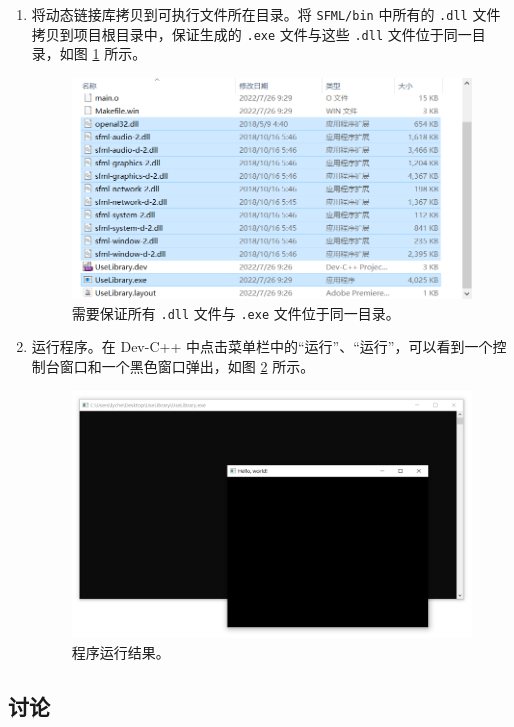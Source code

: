 \begin{enumerate}
\begin{enumerate}
		\item 将动态链接库拷贝到可执行文件所在目录。将 \lstinline[language={}]{SFML/bin} 中所有的 \lstinline[language={}]{.dll} 文件拷贝到项目根目录中，保证生成的 \lstinline[language={}]{.exe} 文件与这些 \lstinline[language={}]{.dll} 文件位于同一目录，如图 \ref{fig:manual-library-6} 所示。

		\begin{figure}
			\centering
			\includegraphics[width=0.75\linewidth]{assets/manual-library-6}
			\caption{需要保证所有 \lstinline[language={}]{.dll} 文件与 \lstinline[language={}]{.exe} 文件位于同一目录。}
			\label{fig:manual-library-6}
		\end{figure}

		\item 运行程序。在 Dev-C++ 中点击菜单栏中的“运行”、“运行”，可以看到一个控制台窗口和一个黑色窗口弹出，如图 \ref{fig:manual-library-7} 所示。

		\begin{figure}
			\centering
			\includegraphics[width=0.75\linewidth]{assets/manual-library-7}
			\caption{程序运行结果。}
			\label{fig:manual-library-7}
		\end{figure}
	\end{enumerate}
\end{enumerate}

\subsection*{讨论}

